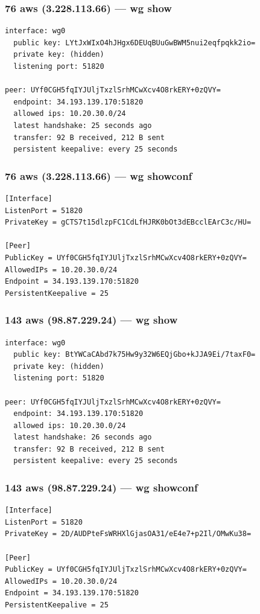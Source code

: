 \documentclass[11pt,a4paper]{article}
\begin{document}
\subsubsection*{76 aws (3.228.113.66) — wg show}
\begin{lstlisting}
interface: wg0
  public key: LYtJxWIxO4hJHgx6DEUqBUuGwBWM5nui2eqfpqkk2io=
  private key: (hidden)
  listening port: 51820

peer: UYf0CGH5fqIYJUljTxzlSrhMCwXcv4O8rkERY+0zQVY=
  endpoint: 34.193.139.170:51820
  allowed ips: 10.20.30.0/24
  latest handshake: 25 seconds ago
  transfer: 92 B received, 212 B sent
  persistent keepalive: every 25 seconds

\end{lstlisting}

\subsubsection*{76 aws (3.228.113.66) — wg showconf}
\begin{lstlisting}
[Interface]
ListenPort = 51820
PrivateKey = gCTS7t15dlzpFC1CdLfHJRK0bOt3dEBcclEArC3c/HU=

[Peer]
PublicKey = UYf0CGH5fqIYJUljTxzlSrhMCwXcv4O8rkERY+0zQVY=
AllowedIPs = 10.20.30.0/24
Endpoint = 34.193.139.170:51820
PersistentKeepalive = 25

\end{lstlisting}

\subsubsection*{143 aws (98.87.229.24) — wg show}
\begin{lstlisting}
interface: wg0
  public key: BtYWCaCAbd7k75Hw9y32W6EQjGbo+kJJA9Ei/7taxF0=
  private key: (hidden)
  listening port: 51820

peer: UYf0CGH5fqIYJUljTxzlSrhMCwXcv4O8rkERY+0zQVY=
  endpoint: 34.193.139.170:51820
  allowed ips: 10.20.30.0/24
  latest handshake: 26 seconds ago
  transfer: 92 B received, 212 B sent
  persistent keepalive: every 25 seconds

\end{lstlisting}

\subsubsection*{143 aws (98.87.229.24) — wg showconf}
\begin{lstlisting}
[Interface]
ListenPort = 51820
PrivateKey = 2D/AUDPteFsWRHXlGjasOA31/eE4e7+p2Il/OMwKu38=

[Peer]
PublicKey = UYf0CGH5fqIYJUljTxzlSrhMCwXcv4O8rkERY+0zQVY=
AllowedIPs = 10.20.30.0/24
Endpoint = 34.193.139.170:51820
PersistentKeepalive = 25

\end{lstlisting}
\end{document}
